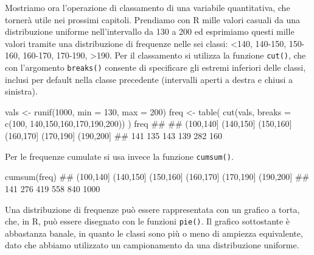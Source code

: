 \documentclass[a4paper,12pt,oneside]{book}
\newenvironment{Shaded}{\begin{snugshade}}{\end{snugshade}}
\newcommand{\DecValTok}[1]{#1}
\newcommand{\DocumentationTok}[1]{#1}
\newcommand{\OtherTok}[1]{#1}
\newcommand{\FunctionTok}[1]{#1}
\newcommand{\AttributeTok}[1]{#1}
\newcommand{\NormalTok}[1]{#1}
\begin{document}
Mostriamo ora l'operazione di classamento di una variabile quantitativa, che tornerà utile nei prossimi capitoli. Prendiamo con R mille valori casuali da una distribuzione uniforme nell'intervallo da 130 a 200 ed esprimiamo questi mille valori tramite una distribuzione di frequenze nelle sei classi: \textless140, 140-150, 150-160, 160-170, 170-190, \textgreater190. Per il classamento si utilizza la funzione \texttt{cut()}, che con l'argomento \texttt{breaks()} consente di specificare gli estremi inferiori delle classi, inclusi per default nella classe precedente (intervalli aperti a destra e chiusi a sinistra).

\begin{Shaded}
\begin{Highlighting}[]
\NormalTok{vals }\OtherTok{\textless{}{-}} \FunctionTok{runif}\NormalTok{(}\DecValTok{1000}\NormalTok{, }\AttributeTok{min =} \DecValTok{130}\NormalTok{, }\AttributeTok{max =} \DecValTok{200}\NormalTok{)}
\NormalTok{freq }\OtherTok{\textless{}{-}} \FunctionTok{table}\NormalTok{( }\FunctionTok{cut}\NormalTok{(vals, }\AttributeTok{breaks =} \FunctionTok{c}\NormalTok{(}\DecValTok{100}\NormalTok{, }\DecValTok{140}\NormalTok{,}\DecValTok{150}\NormalTok{,}\DecValTok{160}\NormalTok{,}\DecValTok{170}\NormalTok{,}\DecValTok{190}\NormalTok{,}\DecValTok{200}\NormalTok{)) )}
\NormalTok{freq}
\DocumentationTok{\#\# }
\DocumentationTok{\#\# (100,140] (140,150] (150,160] (160,170] (170,190] (190,200] }
\DocumentationTok{\#\#       141       135       143       139       282       160}
\end{Highlighting}
\end{Shaded}

Per le frequenze cumulate si usa invece la funzione \texttt{cumsum()}.

\begin{Shaded}
\begin{Highlighting}[]
\FunctionTok{cumsum}\NormalTok{(freq)}
\DocumentationTok{\#\# (100,140] (140,150] (150,160] (160,170] (170,190] (190,200] }
\DocumentationTok{\#\#       141       276       419       558       840      1000}
\end{Highlighting}
\end{Shaded}

Una distribuzione di frequenze può essere rappresentata con un grafico a torta, che, in R, può essere disegnato con le funzioni \texttt{pie()}. Il grafico sottostante è abbastanza banale, in quanto le classi sono più o meno di ampiezza equivalente, dato che abbiamo utilizzato un campionamento da una distribuzione uniforme.
\end{document}
